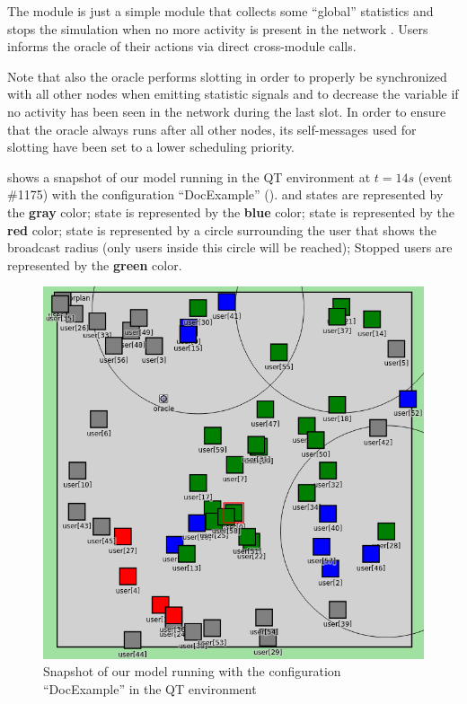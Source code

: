 The  module is just a simple module that collects some ``global''
statistics and stops the simulation when no more activity is present in the
network . Users informs the oracle
of their actions via direct cross-module calls.

Note that also the oracle performs slotting in order to properly be synchronized
with all other nodes when emitting statistic signals and to decrease the
 variable if no activity has been seen in the network during the
last slot. In order to ensure that the oracle always runs after all other nodes,
its self-messages used for slotting have been set to a lower scheduling
priority.

 shows a snapshot of our model running in the \omnetpp{} QT
environment at \(t = 14s\) (event \#1175) with the configuration ``DocExample''
().  and  states are represented by
the \textcolor{idle}{\textbf{gray}} color;  state is represented
by the \textcolor{hearing}{\textbf{blue}} color;  state is
represented by the \textcolor{collision}{\textbf{red}} color; 
state is represented by a circle surrounding the user that shows the broadcast
radius (only users inside this circle will be reached); Stopped users are
represented by the \textcolor{relayed}{\textbf{green}} color.

\begin{figure}[htb]
	\centering
	\includegraphics[width=\textwidth]{img/snapshot}
	\caption{Snapshot of our model running with the configuration
	``DocExample'' in the \omnetpp{} QT environment}\label{fig:snapshot}
\end{figure}
